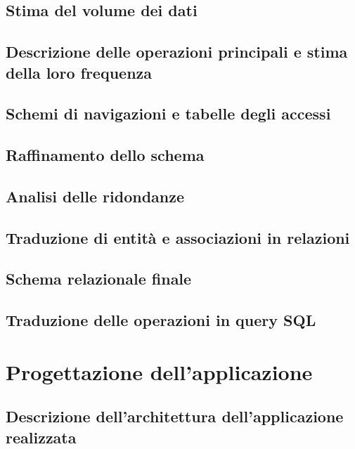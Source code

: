\documentclass[a4paper,12pt, oneside]{article}
\begin{document}
\subsection{Stima del volume dei dati}
\subsection{Descrizione delle operazioni principali e stima della loro frequenza}
\subsection{Schemi di navigazioni e tabelle degli accessi}
\subsection{Raffinamento dello schema}
\subsection{Analisi delle ridondanze}
\subsection{Traduzione di entità e associazioni in relazioni}
\subsection{Schema relazionale finale}
\subsection{Traduzione delle operazioni in query SQL}

\section{Progettazione dell'applicazione}
\subsection{Descrizione dell'architettura dell'applicazione realizzata}
\end{document}
